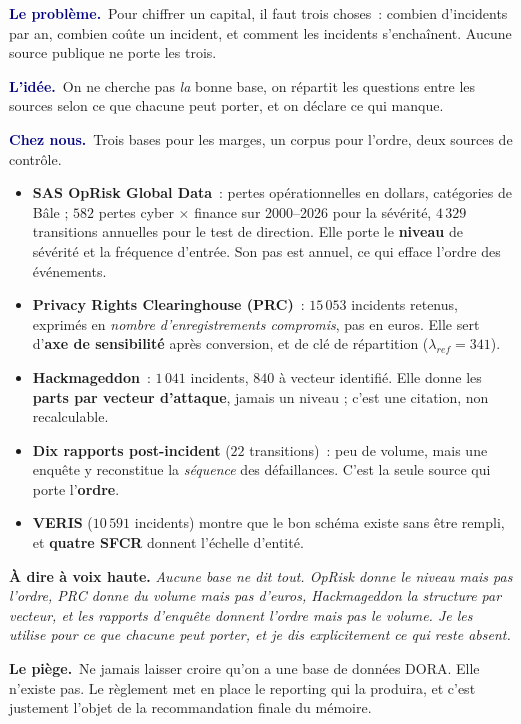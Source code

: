 \documentclass[11pt,a4paper]{article}
\newcommand{\lequoi}[1]{\smallskip\noindent\textcolor{navy}{\textbf{Le problème.}}\ #1\par}
\newcommand{\lidee}[1]{\smallskip\noindent\textcolor{navy}{\textbf{L'idée.}}\ #1\par}
\newcommand{\cheznous}[1]{\smallskip\noindent\textcolor{navy}{\textbf{Chez nous.}}\ #1\par}
\newcommand{\lepiege}[1]{\smallskip\noindent\textcolor{accent}{\textbf{Le piège.}}\ #1\par}
\newcommand{\laphrase}[1]{\begin{phrasebox}\textbf{À dire à voix haute.} \emph{#1}\end{phrasebox}}
\begin{document}
\lequoi{Pour chiffrer un capital, il faut trois choses~: combien d'incidents par an, combien
coûte un incident, et comment les incidents s'enchaînent. Aucune source publique ne porte
les trois.}

\lidee{On ne cherche pas \emph{la} bonne base, on répartit les questions entre les sources
selon ce que chacune peut porter, et on déclare ce qui manque.}

\cheznous{Trois bases pour les marges, un corpus pour l'ordre, deux sources de contrôle.
\begin{itemize}[itemsep=1pt,topsep=2pt]
\item \textbf{SAS OpRisk Global Data}~: pertes opérationnelles en dollars, catégories de Bâle ;
$582$ pertes cyber $\times$ finance sur 2000--2026 pour la sévérité, $4\,329$ transitions
annuelles pour le test de direction. Elle porte le \textbf{niveau} de sévérité et la fréquence
d'entrée. Son pas est annuel, ce qui efface l'ordre des événements.
\item \textbf{Privacy Rights Clearinghouse (PRC)}~: $15\,053$ incidents retenus, exprimés en
\emph{nombre d'enregistrements compromis}, pas en euros. Elle sert d'\textbf{axe de sensibilité}
après conversion, et de clé de répartition ($\lambda_{ref}=341$).
\item \textbf{Hackmageddon}~: $1\,041$ incidents, $840$ à vecteur identifié. Elle donne les
\textbf{parts par vecteur d'attaque}, jamais un niveau ; c'est une citation, non recalculable.
\item \textbf{Dix rapports post-incident} ($22$ transitions)~: peu de volume, mais une enquête y
reconstitue la \emph{séquence} des défaillances. C'est la seule source qui porte
l'\textbf{ordre}.
\item \textbf{VERIS} ($10\,591$ incidents) montre que le bon schéma existe sans être rempli, et
\textbf{quatre SFCR} donnent l'échelle d'entité.
\end{itemize}}

\laphrase{Aucune base ne dit tout. OpRisk donne le niveau mais pas l'ordre, PRC donne du volume
mais pas d'euros, Hackmageddon la structure par vecteur, et les rapports d'enquête donnent l'ordre
mais pas le volume. Je les utilise pour ce que chacune peut porter, et je dis explicitement ce qui
reste absent.}

\lepiege{Ne jamais laisser croire qu'on a \og une base de données DORA\fg{}. Elle n'existe pas.
Le règlement met en place le reporting qui la produira, et c'est justement l'objet de la
recommandation finale du mémoire.}
\end{document}
